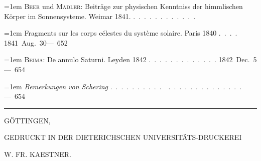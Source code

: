 \noindent\hangindent=1em \textsc{Beer} und \textsc{Mädler}: Beiträge zur physischen Kenntniss der himmlischen Körper im Sonnensysteme. Weimar 1841. \mbox{.\ .\ .\ .\ .\ .\ .\ .\ .\ .\ .\ .}\par\smallskip
\noindent\hangindent=1em Fragments sur les corps célestes du système solaire. Paris 1840 \mbox{.\ .\ .\ .} \hfill\mbox{1841 Aug. 30}\quad\mbox{--- 652}\par\smallskip
\noindent\hangindent=1em \textsc{Beima}: De annulo Saturni. Leyden 1842 \mbox{.\ .\ .\ .\ .\ .\ .\ .\ .\ .\ .\ .\ .} \hfill\mbox{1842 Dec. 5}\quad\mbox{--- 654}\par\smallskip
\noindent\hangindent=1em \emph{Bemerkungen von Schering} \mbox{.\ .\ .\ .\ .\ .\ .\ .\ .\ .\ \ .\ .\ .\ .\ .\ .\ .\ .\ .\ .\ .\ .\ .\ .} \hfill\mbox{}\quad\mbox{--- 654}\par\smallskip
\endgroup
\begin{center}\rule{.25\textwidth}{.3pt}\end{center}
\vspace{1.5\baselineskip}
\bigskip
\begin{center}
GÖTTINGEN,\par\medskip
{\small GEDRUCKT IN DER DIETERICHSCHEN UNIVERSITÄTS-DRUCKEREI}\par\smallskip
{\footnotesize W. FR. KAESTNER.}
\end{center}
\clearpage
\endgroup

